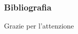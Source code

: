 \documentclass{beamer}
\theoremstyle{plain}
\theoremstyle{definition}
\theoremstyle{remark}
\begin{document}

\nocite{AGG}

\begin{frame}[allowframebreaks]
	\frametitle{Bibliografia}
	
	
\end{frame}

\begin{frame}
	\Huge{\centerline{Grazie per l'attenzione}}
\end{frame}

\end{document}
